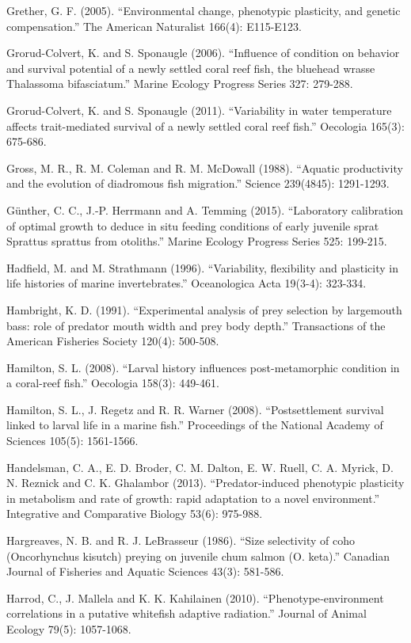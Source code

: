 \documentclass[]{book}
\begin{document}
Grether, G. F. (2005). ``Environmental change, phenotypic plasticity,
and genetic compensation.'' The American Naturalist 166(4): E115-E123.

Grorud-Colvert, K. and S. Sponaugle (2006). ``Influence of condition on
behavior and survival potential of a newly settled coral reef fish, the
bluehead wrasse Thalassoma bifasciatum.'' Marine Ecology Progress Series
327: 279-288.

Grorud-Colvert, K. and S. Sponaugle (2011). ``Variability in water
temperature affects trait-mediated survival of a newly settled coral
reef fish.'' Oecologia 165(3): 675-686.

Gross, M. R., R. M. Coleman and R. M. McDowall (1988). ``Aquatic
productivity and the evolution of diadromous fish migration.'' Science
239(4845): 1291-1293.

Günther, C. C., J.-P. Herrmann and A. Temming (2015). ``Laboratory
calibration of optimal growth to deduce in situ feeding conditions of
early juvenile sprat Sprattus sprattus from otoliths.'' Marine Ecology
Progress Series 525: 199-215.

Hadfield, M. and M. Strathmann (1996). ``Variability, flexibility and
plasticity in life histories of marine invertebrates.'' Oceanologica
Acta 19(3-4): 323-334.

Hambright, K. D. (1991). ``Experimental analysis of prey selection by
largemouth bass: role of predator mouth width and prey body depth.''
Transactions of the American Fisheries Society 120(4): 500-508.

Hamilton, S. L. (2008). ``Larval history influences post-metamorphic
condition in a coral-reef fish.'' Oecologia 158(3): 449-461.

Hamilton, S. L., J. Regetz and R. R. Warner (2008). ``Postsettlement
survival linked to larval life in a marine fish.'' Proceedings of the
National Academy of Sciences 105(5): 1561-1566.

Handelsman, C. A., E. D. Broder, C. M. Dalton, E. W. Ruell, C. A.
Myrick, D. N. Reznick and C. K. Ghalambor (2013). ``Predator-induced
phenotypic plasticity in metabolism and rate of growth: rapid adaptation
to a novel environment.'' Integrative and Comparative Biology 53(6):
975-988.

Hargreaves, N. B. and R. J. LeBrasseur (1986). ``Size selectivity of
coho (Oncorhynchus kisutch) preying on juvenile chum salmon (O. keta).''
Canadian Journal of Fisheries and Aquatic Sciences 43(3): 581-586.

Harrod, C., J. Mallela and K. K. Kahilainen (2010).
``Phenotype‐environment correlations in a putative whitefish adaptive
radiation.'' Journal of Animal Ecology 79(5): 1057-1068.
\end{document}
